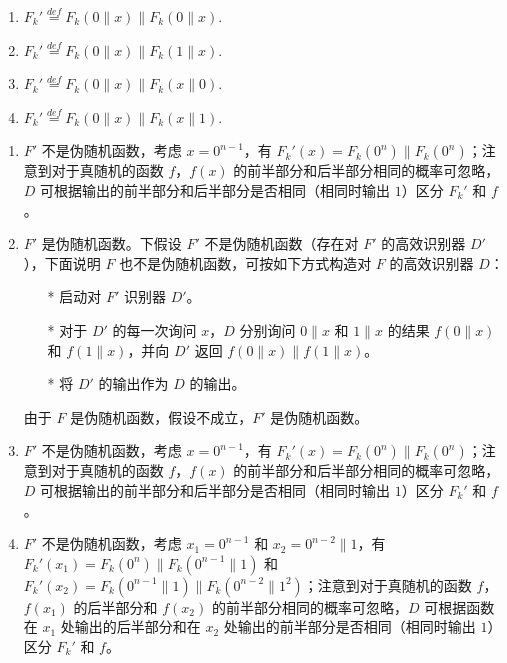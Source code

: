 \begin{questions}
        \begin{enumerate}
            \item $F_k'\overset{def}=F_k(0\parallel{x})\parallel{F_k}(0\parallel{x})$.
            \item $F_k'\overset{def}=F_k(0\parallel{x})\parallel{F_k}(1\parallel{x})$.
            \item $F_k'\overset{def}=F_k(0\parallel{x})\parallel{F_k}(x\parallel{0})$.
            \item $F_k'\overset{def}=F_k(0\parallel{x})\parallel{F_k}(x\parallel{1})$.
        \end{enumerate}

        \begin{solution}
            \begin{enumerate}
                \item $F'$ 不是伪随机函数，考虑 $x=0^{n-1}$，有 $F_k'(x)=F_k(0^n)\parallel{F_k}(0^n)$；注意到对于真随机的函数 $f$，$f(x)$ 的前半部分和后半部分相同的概率可忽略，$D$ 可根据输出的前半部分和后半部分是否相同（相同时输出 $1$）区分 $F_k'$ 和 $f$。
                \item $F'$ 是伪随机函数。下假设 $F'$ 不是伪随机函数（存在对 $F'$ 的高效识别器 $D'$），下面说明 $F$ 也不是伪随机函数，可按如下方式构造对 $F$ 的高效识别器 $D$：
                    \begin{enumerate}
                        \item[*] 启动对 $F'$ 识别器 $D'$。
                        \item[*] 对于 $D'$ 的每一次询问 $x$，$D$ 分别询问 $0\parallel{x}$ 和 $1\parallel{x}$ 的结果 $f(0\parallel{x})$ 和 $f(1\parallel{x})$，并向 $D'$ 返回 $f(0\parallel{x})\parallel{f}(1\parallel{x})$。
                        \item[*] 将 $D'$ 的输出作为 $D$ 的输出。
                    \end{enumerate}
                    由于 $F$ 是伪随机函数，假设不成立，$F'$ 是伪随机函数。
                \item $F'$ 不是伪随机函数，考虑 $x=0^{n-1}$，有 $F_k'(x)=F_k(0^n)\parallel{F_k}(0^n)$；注意到对于真随机的函数 $f$，$f(x)$ 的前半部分和后半部分相同的概率可忽略，$D$ 可根据输出的前半部分和后半部分是否相同（相同时输出 $1$）区分 $F_k'$ 和 $f$。
                \item $F'$ 不是伪随机函数，考虑 $x_1=0^{n-1}$ 和 $x_2=0^{n-2}\parallel1$，有 $F_k'(x_1)=F_k(0^n)\parallel{F_k}(0^{n-1}\parallel1)$ 和 $F_k'(x_2)=F_k(0^{n-1}\parallel1)\parallel{F_k}(0^{n-2}\parallel1^2)$；注意到对于真随机的函数 $f$，$f(x_1)$ 的后半部分和 $f(x_2)$ 的前半部分相同的概率可忽略，$D$ 可根据函数在 $x_1$ 处输出的后半部分和在 $x_2$ 处输出的前半部分是否相同（相同时输出 $1$）区分 $F_k'$ 和 $f$。
            \end{enumerate}
        \end{solution}


\end{questions}
